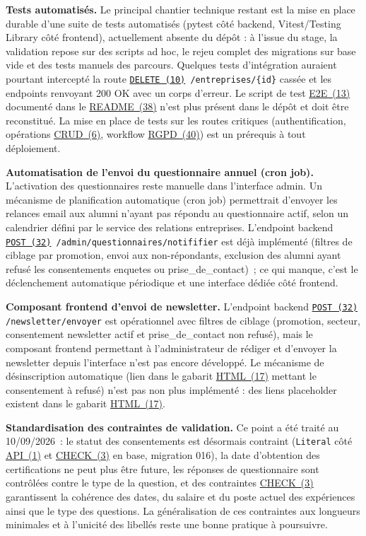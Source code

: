 \documentclass[12pt,a4paper]{report}
\begin{document}
\textbf{Tests automatisés.} Le principal chantier technique restant est la mise en place durable d'une suite de tests automatisés (pytest côté backend, Vitest/Testing Library côté frontend), actuellement absente du dépôt : à l'issue du stage, la validation repose sur des scripts ad hoc, le rejeu complet des migrations sur base vide et des tests manuels des parcours. Quelques tests d'intégration auraient pourtant intercepté la route \texttt{\hyperlink{abbr-DELETE}{DELETE~(10)} /entreprises/\{id\}} cassée et les endpoints renvoyant 200 OK avec un corps d'erreur. Le script de test \hyperlink{abbr-E2E}{E2E~(13)} documenté dans le \hyperlink{abbr-README}{README~(38)} n'est plus présent dans le dépôt et doit être reconstitué. La mise en place de tests sur les routes critiques (authentification, opérations \hyperlink{abbr-CRUD}{CRUD~(6)}, workflow \hyperlink{abbr-RGPD}{RGPD~(40)}) est un prérequis à tout déploiement.

\textbf{Automatisation de l'envoi du questionnaire annuel (cron job).} L'activation des questionnaires reste manuelle dans l'interface admin. Un mécanisme de planification automatique (cron job) permettrait d'envoyer les relances email aux alumni n'ayant pas répondu au questionnaire actif, selon un calendrier défini par le service des relations entreprises. L'endpoint backend \texttt{\hyperlink{abbr-POST}{POST~(32)} /admin/questionnaires/notififier} est déjà implémenté (filtres de ciblage par promotion, envoi aux non-répondants, exclusion des alumni ayant refusé les consentements \og{}enquetes\fg{} ou \og{}prise\_de\_contact\fg{})~; ce qui manque, c'est le déclenchement automatique périodique et une interface dédiée côté frontend.

\textbf{Composant frontend d'envoi de newsletter.} L'endpoint backend \texttt{\hyperlink{abbr-POST}{POST~(32)} /newsletter/envoyer} est opérationnel avec filtres de ciblage (promotion, secteur, consentement \og{}newsletter\fg{} actif et \og{}prise\_de\_contact\fg{} non refusé), mais le composant frontend permettant à l'administrateur de rédiger et d'envoyer la newsletter depuis l'interface n'est pas encore développé. Le mécanisme de désinscription automatique (lien dans le gabarit \hyperlink{abbr-HTML}{HTML~(17)} mettant le consentement à \og{}refusé\fg{}) n'est pas non plus implémenté : des liens placeholder existent dans le gabarit \hyperlink{abbr-HTML}{HTML~(17)}.

\textbf{Standardisation des contraintes de validation.} Ce point a été traité au 10/09/2026~: le statut des consentements est désormais contraint (\texttt{Literal} côté \hyperlink{abbr-API}{API~(1)} et \hyperlink{abbr-CHECK}{CHECK~(3)} en base, migration 016), la date d'obtention des certifications ne peut plus être future, les réponses de questionnaire sont contrôlées contre le type de la question, et des contraintes \hyperlink{abbr-CHECK}{CHECK~(3)} garantissent la cohérence des dates, du salaire et du poste actuel des expériences ainsi que le type des questions. La généralisation de ces contraintes aux longueurs minimales et à l'unicité des libellés reste une bonne pratique à poursuivre.
\end{document}
